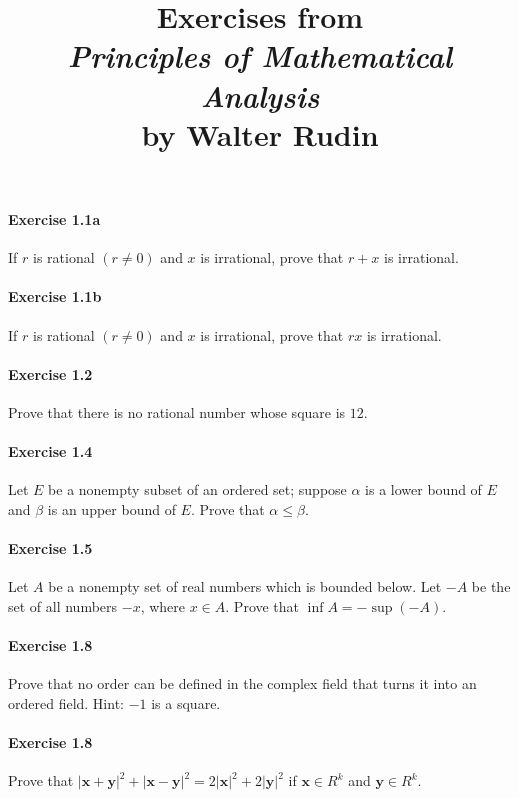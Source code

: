 \documentclass{article}
\title{\textbf{
Exercises from \\
\textit{Principles of Mathematical Analysis} \\
by Walter Rudin
}}
\date{}
\begin{document}
\maketitle

\paragraph{Exercise 1.1a} If $r$ is rational $(r \neq 0)$ and $x$ is irrational, prove that $r+x$ is irrational.

\paragraph{Exercise 1.1b} If $r$ is rational $(r \neq 0)$ and $x$ is irrational, prove that $rx$ is irrational.

\paragraph{Exercise 1.2} Prove that there is no rational number whose square is $12$.

\paragraph{Exercise 1.4} Let $E$ be a nonempty subset of an ordered set; suppose $\alpha$ is a lower bound of $E$ and $\beta$ is an upper bound of $E$. Prove that $\alpha \leq \beta$.

\paragraph{Exercise 1.5} Let $A$ be a nonempty set of real numbers which is bounded below. Let $-A$ be the set of all numbers $-x$, where $x \in A$. Prove that $\inf A=-\sup (-A)$.

\paragraph{Exercise 1.8} Prove that no order can be defined in the complex field that turns it into an ordered field. Hint: $-1$ is a square.

\paragraph{Exercise 1.8} Prove that $|\mathbf{x}+\mathbf{y}|^{2}+|\mathbf{x}-\mathbf{y}|^{2}=2|\mathbf{x}|^{2}+2|\mathbf{y}|^{2}$ if $\mathbf{x} \in R^{k}$ and $\mathbf{y} \in R^{k}$.
\end{document}
